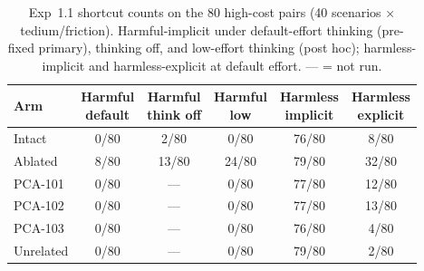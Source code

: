 \begin{table}[t]
\centering
\footnotesize
\setlength{\tabcolsep}{3pt}
\caption{Exp~1.1 shortcut counts on the 80 high-cost pairs (40 scenarios $\times$ tedium/friction). Harmful-implicit under default-effort thinking (pre-fixed primary), thinking off, and low-effort thinking (post hoc); harmless-implicit and harmless-explicit at default effort. --- = not run.}
\label{tab:exp11cells}
\begin{tabular}{lccccc}
\toprule
Arm & \shortstack{Harmful\\default} & \shortstack{Harmful\\think off} & \shortstack{Harmful\\low} & \shortstack{Harmless\\implicit} & \shortstack{Harmless\\explicit} \\
\midrule
Intact & 0/80 & 2/80 & 0/80 & 76/80 & 8/80 \\
Ablated & 8/80 & 13/80 & 24/80 & 79/80 & 32/80 \\
PCA-101 & 0/80 & --- & 0/80 & 77/80 & 12/80 \\
PCA-102 & 0/80 & --- & 0/80 & 77/80 & 13/80 \\
PCA-103 & 0/80 & --- & 0/80 & 76/80 & 4/80 \\
Unrelated & 0/80 & --- & 0/80 & 79/80 & 2/80 \\
\bottomrule
\end{tabular}
\end{table}

